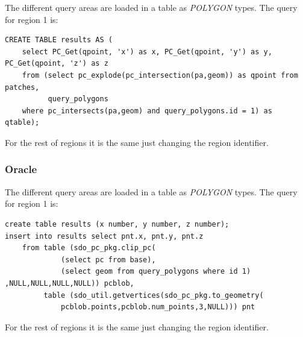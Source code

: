 \documentclass[a4paper,11pt]{article}
\begin{document}
The different query areas are loaded in a table as \textit{POLYGON} types. 
The query for region 1 is:


\begin{verbatim}
CREATE TABLE results AS (
    select PC_Get(qpoint, 'x') as x, PC_Get(qpoint, 'y') as y, PC_Get(qpoint, 'z') as z  
    from (select pc_explode(pc_intersection(pa,geom)) as qpoint from patches, 
          query_polygons
    where pc_intersects(pa,geom) and query_polygons.id = 1) as qtable);
\end{verbatim}

For the rest of regions it is the same just changing the region identifier.

\subsubsection{Oracle}

The different query areas are loaded in a table as \textit{POLYGON} types. The query for region 1 is:

\begin{verbatim}
create table results (x number, y number, z number);
insert into results select pnt.x, pnt.y, pnt.z 
    from table (sdo_pc_pkg.clip_pc(
             (select pc from base),
             (select geom from query_polygons where id 1) ,NULL,NULL,NULL,NULL)) pcblob, 
         table (sdo_util.getvertices(sdo_pc_pkg.to_geometry(
             pcblob.points,pcblob.num_points,3,NULL))) pnt
\end{verbatim}

For the rest of regions it is the same just changing the region identifier.
\end{document}
